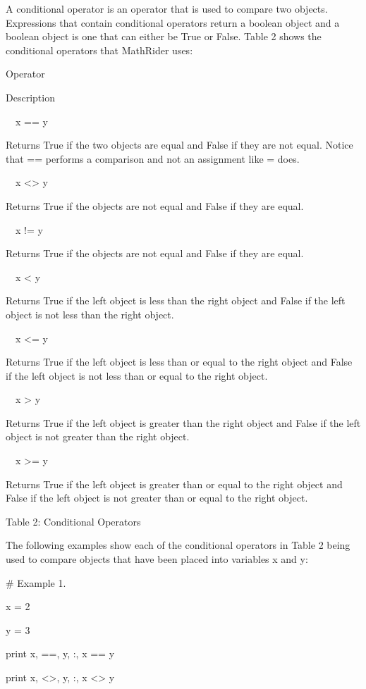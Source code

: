 \documentclass[12pt,oneside]{book}
\begin{document}
A conditional operator is an operator that is used to compare two objects. Expressions that contain conditional operators return a boolean object and a boolean object is one that can either be True or False. Table 2 shows the conditional operators that MathRider uses: 

Operator

Description

\ \ x == y

Returns True if the two objects are equal and False if they are not equal. Notice that == performs a comparison and not an assignment like = does.

\ \ x {\textless}{\textgreater} y

Returns True if the objects are not equal and False if they are equal.

\ \ x != y

Returns True if the objects are not equal and False if they are equal.

\ \ x {\textless} y

Returns True if the left object is less than the right object and False if the left object is not less than the right object.

\ \ x {\textless}= y

Returns True if the left object is less than or equal to the right object and False if the left object is not less than or equal to the right object.

\ \ x {\textgreater} y

Returns True if the left object is greater than the right object and False if the left object is not greater than the right object.

\ \ x {\textgreater}= y

Returns True if the left object is greater than or equal to the right object and False if the left object is not greater than or equal to the right object.

Table 2: Conditional Operators


The following examples show each of the conditional operators in Table 2 being used to compare objects that have been placed into variables x and y:


\# Example 1.

x = 2

y = 3 


print x, {\textquotedbl}=={\textquotedbl}, y, {\textquotedbl}:{\textquotedbl}, x == y

print x, {\textquotedbl}{\textless}{\textgreater}{\textquotedbl}, y, {\textquotedbl}:{\textquotedbl}, x {\textless}{\textgreater} y
\end{document}
